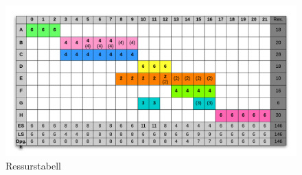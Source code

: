 	\begin{figure}[H]
		\centering
		\includegraphics[scale=0.55, angle=90]{task1.png}
		\caption{Ressurstabell}
	\end{figure}